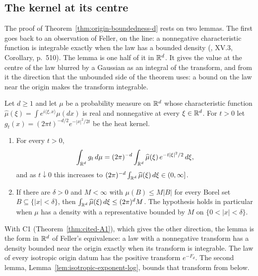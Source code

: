 \subsection{The kernel at its centre}\label{supp:proofs-origin}

The proof of Theorem~\ref{thm:origin-boundedness-d} rests on two lemmas. The first goes back to an
observation of Feller, on the line: a nonnegative characteristic function is integrable exactly
when the law has a bounded density (, XV.3, Corollary, p.~510).
The lemma is one half of it in $\mathbb{R}^d$. It gives the value at the centre of the law blurred by a
Gaussian as an integral of the transform, and from it the direction that the unbounded side of
the theorem uses: a bound on the law near the origin makes the transform integrable.

\begin{lemma}\label{lem:positive-transform-origin}
Let $d \ge 1$ and let $\mu$ be a probability measure on $\mathbb{R}^d$ whose characteristic function
$\widehat\mu(\xi) = \int e^{i\langle\xi,x\rangle}\mu(dx)$ is real and nonnegative at every
$\xi \in \mathbb{R}^d$. For $t > 0$ let $g_t(x) = (2\pi t)^{-d/2}e^{-|x|^2/2t}$ be the heat kernel.
\begin{enumerate}
\item For every $t > 0$,
\[
  \int_{\mathbb{R}^d} g_t\,d\mu = (2\pi)^{-d}\int_{\mathbb{R}^d}\widehat\mu(\xi)\,e^{-t|\xi|^2/2}\,d\xi ,
\]
and as $t \downarrow 0$ this increases to $(2\pi)^{-d}\int_{\mathbb{R}^d}\widehat\mu(\xi)\,d\xi \in (0,\infty]$.
\item If there are $\delta > 0$ and $M < \infty$ with $\mu(B) \le M|B|$ for every Borel set
$B \subseteq \{|x| < \delta\}$, then $\int_{\mathbb{R}^d}\widehat\mu(\xi)\,d\xi \le (2\pi)^d M$. The
hypothesis holds in particular when $\mu$ has a density with a representative bounded by $M$ on
$\{0 < |x| < \delta\}$.
\end{enumerate}
\end{lemma}

With C1 (Theorem~\ref{thm:cited-A1}), which gives the other direction, the lemma is the form in
$\mathbb{R}^d$ of Feller's equivalence: a law with a nonnegative transform has a density bounded near
the origin exactly when its transform is integrable. The law of every isotropic origin datum has
the positive transform $e^{-F_d}$. The second lemma, Lemma~\ref{lem:isotropic-exponent-log},
bounds that transform from below.

